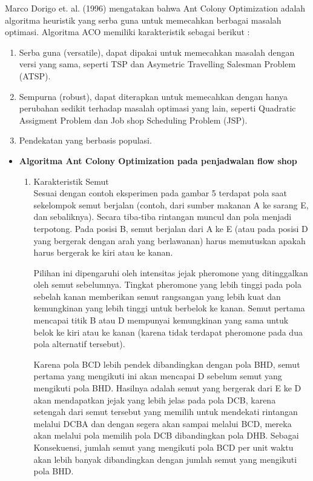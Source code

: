 \documentclass[a4paper,twoside]{article}
\begin{document}
\begin{enumerate}
\begin{itemize}
		Marco Dorigo et. al. (1996) mengatakan bahwa Ant Colony Optimization adalah algoritma heuristik yang serba guna untuk memecahkan berbagai masalah optimasi. Algoritma ACO memiliki karakteristik sebagai berikut :
		\begin{enumerate}
			\item Serba guna (versatile), dapat dipakai untuk memecahkan masalah dengan versi yang sama, seperti TSP dan Asymetric Travelling Salesman Problem (ATSP).
			\item Sempurna (robust), dapat diterapkan untuk memecahkan dengan hanya perubahan sedikit terhadap masalah optimasi yang lain, seperti Quadratic Assigment Problem dan Job shop Scheduling Problem (JSP).
			\item Pendekatan yang berbasis populasi.
		\end{enumerate}
		\end{itemize}	
		
		\begin{itemize}
		\item {\bf Algoritma Ant Colony Optimization pada penjadwalan flow shop}
		\begin{enumerate}
			\item Karakteristik Semut \\
			Sesuai dengan contoh eksperimen pada gambar 5 terdapat pola saat sekelompok semut berjalan (contoh, dari sumber makanan A ke sarang E, dan sebaliknya). Secara tiba-tiba rintangan muncul dan pola menjadi terpotong. Pada posisi B, semut berjalan dari A ke E (atau pada posisi D yang bergerak dengan arah yang berlawanan) harus memutuskan apakah harus bergerak ke kiri atau ke kanan.
			
			Pilihan ini dipengaruhi oleh intensitas jejak pheromone yang ditinggalkan oleh semut sebelumnya. Tingkat pheromone yang lebih tinggi pada pola sebelah kanan memberikan semut rangsangan yang lebih kuat dan kemungkinan yang lebih tinggi untuk berbelok ke kanan. Semut pertama mencapai titik B atau D mempunyai kemungkinan yang sama untuk belok ke kiri atau ke kanan (karena tidak terdapat pheromone pada dua pola alternatif tersebut).
			
			Karena pola BCD lebih pendek dibandingkan dengan pola BHD, semut pertama yang mengikuti ini akan mencapai D sebelum semut yang mengikuti pola BHD. Hasilnya adalah semut yang bergerak dari E ke D akan mendapatkan jejak yang lebih jelas pada pola DCB, karena setengah dari semut tersebut yang memilih untuk mendekati rintangan melalui DCBA dan dengan segera akan sampai melalui BCD, mereka akan melalui pola memilih pola DCB dibandingkan pola DHB. Sebagai Konsekuensi, jumlah semut yang mengikuti pola BCD per unit waktu akan lebih banyak dibandingkan dengan jumlah semut yang mengikuti pola BHD.
			

\end{enumerate}
\end{itemize}
\end{enumerate}
\end{document}
